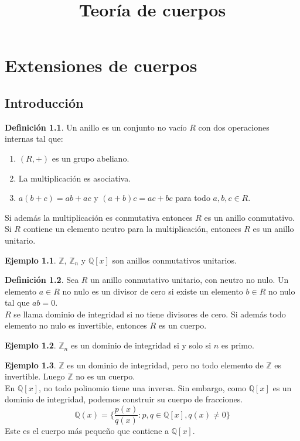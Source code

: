 \documentclass{report}
\title{Teoría de cuerpos}
\author{}
\theoremstyle{remark}
\theoremstyle{definition}
\newtheorem{definition}{Definición}[chapter]
\theoremstyle{definition}
\theoremstyle{definition}
\newtheorem*{example}{Ejemplo}
\begin{document}
\maketitle
\tableofcontents

\chapter{Extensiones de cuerpos}
\section{Introducción}

\begin{definition}
    Un anillo es un conjunto no vacío $R$ con dos operaciones internas tal que:
    \begin{enumerate}
        \item $(R, +)$ es un grupo abeliano.
        \item La multiplicación es asociativa.
        \item $a(b + c) = ab + ac$ y $(a + b)c = ac + bc$ para todo $a, b, c \in R$.
    \end{enumerate}
    Si además la multiplicación es conmutativa entonces $R$ es un anillo conmutativo.
    Si $R$ contiene un elemento neutro para la multiplicación, entonces $R$ es un anillo unitario.
\end{definition}

\begin{example}
    $\mathbb{Z}$, $\mathbb{Z}_n$ y $\mathbb{Q}[x]$ son anillos conmutativos unitarios.
\end{example}

\begin{definition}
    Sea $R$ un anillo conmutativo unitario, con neutro no nulo.
    Un elemento $a \in R$ no nulo es un divisor de cero si existe un elemento $b \in R$ no nulo tal que $ab = 0$.\\
    $R$ se llama dominio de integridad si no tiene divisores de cero.
    Si además todo elemento no nulo es invertible, entonces $R$ es un cuerpo.
\end{definition}

\begin{example}
    $\mathbb{Z}_n$ es un dominio de integridad si y solo si $n$ es primo.
\end{example}

\begin{example}
    $\mathbb{Z}$ es un dominio de integridad, pero no todo elemento de $\mathbb{Z}$ es invertible. Luego $\mathbb{Z}$ no es un cuerpo.\\
    En $\mathbb{Q}[x]$, no todo polinomio tiene una inversa. Sin embargo, como $\mathbb{Q}[x]$ es un dominio de integridad, podemos construir su cuerpo de fracciones.
    $$\mathbb{Q}(x) = \{ \frac{p(x)}{q(x)} : p, q \in \mathbb{Q}[x], q(x) \neq 0 \}$$
    Este es el cuerpo más pequeño que contiene a $\mathbb{Q}[x]$.
\end{example}
\end{document}
